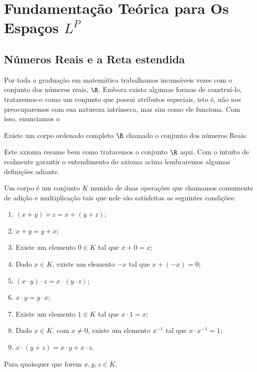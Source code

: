 \chapter{Fundamentação Teórica para Os Espaços $L^P$}

\section{Números Reais e a Reta estendida}
Por toda a graduação em matemática trabalhamos incansáveis vezes com o conjunto dos números reais, $\R$.
Embora exista algumas formas de construí-lo, trataremos-o como um conjunto que possui atributos especiais, isto é, não nos preocuparemos com sua natureza intrínseca, mas sim como ele funciona.
Com isso, enunciamos o 

\begin{axiom}
\label{ax:reais}
    Existe um corpo ordenado completo $\R$ chamado o conjunto dos números Reais.
\end{axiom}

Este axioma resume bem como trataremos o conjunto $\R$ aqui. 
Com o intuito de realmente garantir o entendimento do axioma acima lembraremos algumas definições adiante.

\begin{definition}
\label{def:corpo}
    Um corpo é um conjunto $K$ munido de duas operações que chamamos comumente de adição e multiplicação tais que nele são satisfeitas as seguintes condições:
    \begin{enumerate}[label*=(\roman*)]
        \item $(x + y) + z = x + (y + z)$;
        \item $x + y = y + x$;
        \item Existe um elemento $0 \in K$ tal que $x + 0 = x$;
        \item Dado $x \in K$, existe um elemento $-x$ tal que $x + (-x) = 0$;
        \item $(x \cdot y) \cdot z = x \cdot (y \cdot z)$;
        \item $x \cdot y = y \cdot x$;
        \item Existe um elemento $1 \in K$ tal que $x \cdot 1 = x$;
        \item Dado $x \in K$, com $x \neq 0$, existe um elemento $x^{-1}$ tal que $x \cdot x^{-1} =1$;
        \item $x\cdot (y + z ) = x\cdot y + x \cdot z$.
    \end{enumerate}
    Para quaisquer que forem $x,y,z \in K$.
\end{definition}


